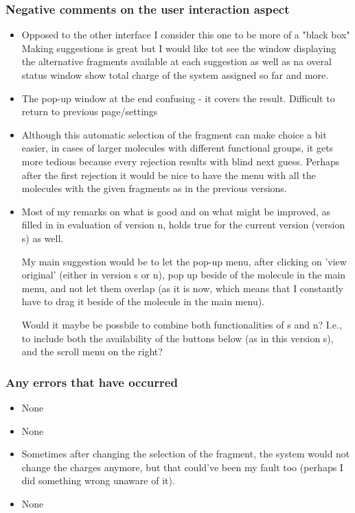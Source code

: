 \subsubsection{Negative comments on the user interaction aspect}
\begin{itemize}
\item Opposed to the other interface I consider this one to be more of a "black box" Making suggestions is great but I would like tot see the window displaying the alternative fragments available at each suggestion as well as na overal status window show total charge of the system assigned so far and more. 

\item The pop-up window at the end confusing - it covers the result. Difficult to return to previous page/settings

\item Although this automatic selection of the fragment can make choice a bit easier, in cases of larger molecules with different functional groups, it gets more tedious because every rejection results with blind next guess. Perhaps after the first rejection it would be nice to have the menu with all the molecules with the given fragments as in the previous versions.

\item Most of my remarks on what is good and on what might be improved, as filled in in evaluation of version n, holds true for the current version (version s) as well.


My main suggestion would be to let the pop-up menu, after clicking on 'view original' (either in version s or n), pop up beside of the molecule in the main menu, and not let them overlap (as it is now, which means that I constantly have to drag it beside of the molecule in the main menu).


Would it maybe be possbile to combine both functionalities of s and n? I.e., to include both the availability of the buttons below (as in this version s), and the scroll menu on the right?

\end{itemize}


\subsubsection{Any errors that have occurred}
\begin{itemize}
\item None

\item None

\item Sometimes after changing the selection of the fragment, the system would not change the charges anymore, but that could've been my fault too (perhaps I did something wrong unaware of it).

\item None

\end{itemize}



